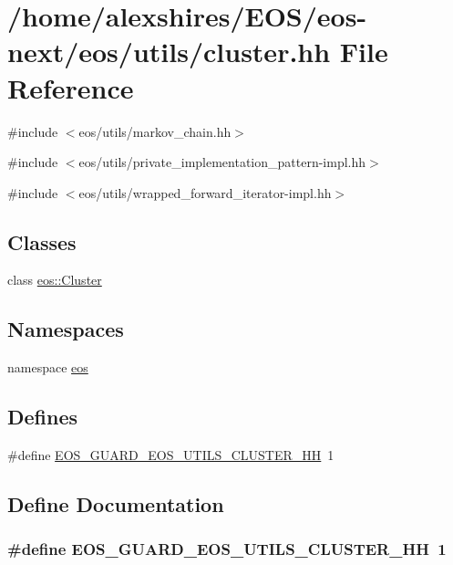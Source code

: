 \hypertarget{cluster_8hh}{
\section{/home/alexshires/EOS/eos-\/next/eos/utils/cluster.hh File Reference}
\label{cluster_8hh}
}
{\ttfamily \#include $<$eos/utils/markov\_\-chain.hh$>$}\par
{\ttfamily \#include $<$eos/utils/private\_\-implementation\_\-pattern-\/impl.hh$>$}\par
{\ttfamily \#include $<$eos/utils/wrapped\_\-forward\_\-iterator-\/impl.hh$>$}\par
\subsection*{Classes}
\begin{DoxyCompactItemize}
\item 
class \hyperlink{classeos_1_1Cluster}{eos::Cluster}
\end{DoxyCompactItemize}
\subsection*{Namespaces}
\begin{DoxyCompactItemize}
\item 
namespace \hyperlink{namespaceeos}{eos}
\end{DoxyCompactItemize}
\subsection*{Defines}
\begin{DoxyCompactItemize}
\item 
\#define \hyperlink{cluster_8hh_a029bee19b88e954c18e4dcd3623de3b3}{EOS\_\-GUARD\_\-EOS\_\-UTILS\_\-CLUSTER\_\-HH}~1
\end{DoxyCompactItemize}


\subsection{Define Documentation}
\hypertarget{cluster_8hh_a029bee19b88e954c18e4dcd3623de3b3}{
\subsubsection[{EOS\_\-GUARD\_\-EOS\_\-UTILS\_\-CLUSTER\_\-HH}]{\setlength{\rightskip}{0pt plus 5cm}\#define EOS\_\-GUARD\_\-EOS\_\-UTILS\_\-CLUSTER\_\-HH~1}}
\label{cluster_8hh_a029bee19b88e954c18e4dcd3623de3b3}

